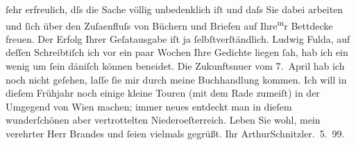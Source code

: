 \begin{ledgroupsized}[t]{13cm}
               ſehr erfreulich, dſs die Sache völlig unbedenklich iſt und daſs Sie dabei arbeiten
               und ſich über den Zuſa{\geminationm}enfluſs von Büchern und Briefen
               auf Ihre\substVorne{}\textsuperscript{m}\substDazwischen{}r\substHinten{} Bettdecke freuen. Der Erfolg Ihrer Geſa{\geminationm}tausgabe iſt ja
               ſelbſtverſtändlich. Ludwig Fulda, auf deſſen
               Schreibtiſch ich vor ein paar Wochen {\pb}Ihre Gedichte liegen ſah, hab ich ein
               wenig um ſein däniſch können beneidet. Die Zukunftsnu{\geminationm}er vom
                  7. April hab ich noch nicht geſehen, laſſe ſie mir durch meine
               Buchhandlung kommen.\pend
           \pstart
           Ich will in dieſem Frühjahr noch einige kleine Touren (mit dem Rade zumeiſt) in der
               Umgegend von Wien machen; immer neues entdeckt man in
               dieſem wunderſchönen aber vertrottelten Niederoeſterreich.\pend
           \pstart
           {\pb}Leben Sie wohl, mein verehrter Herr Brandes und
               ſeien vielmals gegrüßt.\pend
           \pstart Ihr \spacefill\mbox{ArthurSchnitzler}\pend{}. 5. 99.\pend
           
         
         \endnumbering{}\end{ledgroupsized}  \newcommand{\dateiname}{L00917}\newcommand{\titel}{Arthur Schnitzler an Georg Brandes, 19. 5. 1899}\newcommand{\editorInnen}{Martin Anton Müller und Gerd-Hermann Susen}
      
